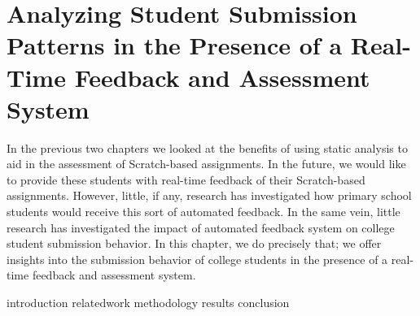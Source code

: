 \chapter{Analyzing Student Submission Patterns in the Presence of a Real-Time
  Feedback and Assessment System}
\label{chap:feedback}

\def\currentprefix{feedback}

In the previous two chapters we looked at the benefits of using static analysis
to aid in the assessment of Scratch-based assignments. In the future, we would
like to provide these students with real-time feedback of their Scratch-based
assignments. However, little, if any, research has investigated how primary
school students would receive this sort of automated feedback. In the same
vein, little research has investigated the impact of automated feedback system
on college student submission behavior. In this chapter, we do precisely that;
we offer insights into the submission behavior of college students in the
presence of a real-time feedback and assessment system.

{introduction}
{relatedwork}
{methodology}
{results}
{conclusion}
